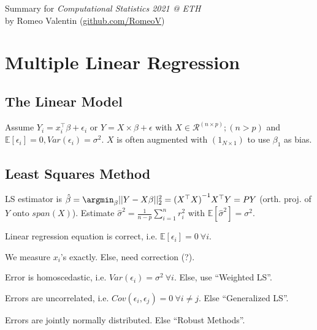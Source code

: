 \noindent Summary for \emph{Computational Statistics 2021 @ ETH}\\
by Romeo Valentin (\url{github.com/RomeoV})
\section{Multiple Linear Regression}\label{sec:multiple_linear_regression}
\subsection{The Linear Model}\label{subsec:the_linear_model}
\begin{sectionbox}\nospacing{}
Assume $Y_i = x_{i}^{\top}\beta + \epsilon_{i}$ or $Y = X \times \beta + \epsilon$ with $X \in \mathcal{R}^{(n \times p)}; (n > p)$ and $\mathbb{E}[\epsilon_{i}]=0, Var(\epsilon_{i}) = \sigma^{2}$.
$X$ is often augmented with $(1_{N\times 1})$ to use $\beta_{1}$ as bias.
\end{sectionbox}
\subsection{Least Squares Method}\label{subsec:least_squares_method}
\begin{sectionbox}\nospacing{}
  LS estimator is $\hat \beta = \argmin_{\beta} ||Y - X\beta||^{2}_{2} = {(X^{\top}X)}^{-1} X^{\top}Y = PY$ (orth. proj. of $Y$ onto $span(X)$).
  Estimate $\hat{\sigma}^{2} = \frac{1}{n-p}\sum_{i=1}^{n}r_{i}^{2}$ with $\mathbb{E}[\hat{\sigma}^{2}] = \sigma^{2}$.
\end{sectionbox}

\begin{notebox}\nospacing{}
    \begin{enumeratenosep}[label=\roman*]
        \item Linear regression equation is correct, i.e. $\mathbb{E}[\epsilon_{i}]=0\ \forall i$.
        \item We measure $x_{i}$'s exactly. Else, need correction (?).
        \item Error is homoscedastic, i.e. $Var(\epsilon_{i})=\sigma^{2}\ \forall i$. Else, use ``Weighted LS''.
        \item Errors are uncorrelated, i.e. $Cov(\epsilon_{i}, \epsilon_{j}) = 0\ \forall i \neq j$. Else ``Generalized LS''.
        \item Errors are jointly normally distributed. Else ``Robust Methods''.
    \end{enumeratenosep}
\end{notebox}

